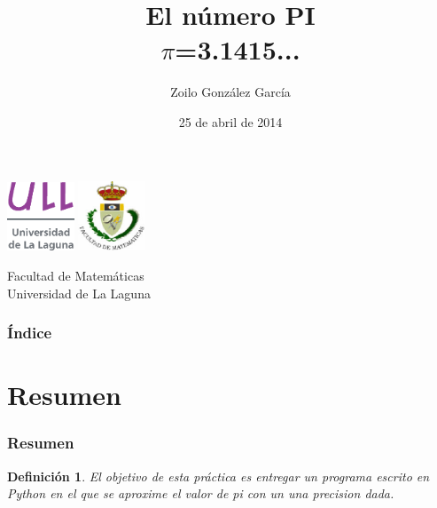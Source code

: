 \documentclass{beamer}
\title[Presentación con Beamer]{El número PI\\ $\pi$=3.1415...}
\author[Técnicas Experimentales]{Zoilo González García}
\date[25-04-2014]{25 de abril de 2014}
\newtheorem{definicion}{Definición}
\begin{document}
  
\begin{frame}

  \includegraphics[width=0.15\textwidth]{img/ullesc}
  \hspace*{7.0cm}
  \includegraphics[width=0.15\textwidth]{img/fmatesc}
  \titlepage

  \begin{small}
    \begin{center}
     Facultad de Matemáticas \\
     Universidad de La Laguna
    \end{center}
  \end{small}

\end{frame}

\begin{frame}
  \frametitle{Índice}  
  \tableofcontents[pausesections]
\end{frame}


\section{Resumen}


\begin{frame}

\frametitle{Resumen}

\begin{definicion}
El objetivo de esta práctica es entregar un programa escrito en \textsf{Python} \cite{URL:XML}
en el que se aproxime el valor de pi con un una precision dada.

\end{definicion}

\end{frame}
\end{document}
